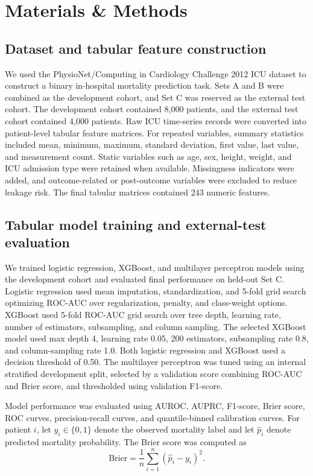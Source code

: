 \documentclass[10pt,twocolumn,letterpaper]{article}
\begin{document}
\section{Materials \& Methods}

\subsection{Dataset and tabular feature construction}

We used the PhysioNet/Computing in Cardiology Challenge 2012 ICU dataset to construct a binary in-hospital mortality prediction task. Sets A and B were combined as the development cohort, and Set C was reserved as the external test cohort. The development cohort contained 8,000 patients, and the external test cohort contained 4,000 patients. Raw ICU time-series records were converted into patient-level tabular feature matrices. For repeated variables, summary statistics included mean, minimum, maximum, standard deviation, first value, last value, and measurement count. Static variables such as age, sex, height, weight, and ICU admission type were retained when available. Missingness indicators were added, and outcome-related or post-outcome variables were excluded to reduce leakage risk. The final tabular matrices contained 243 numeric features.

\subsection{Tabular model training and external-test evaluation}

We trained logistic regression, XGBoost, and multilayer perceptron models using the development cohort and evaluated final performance on held-out Set C. Logistic regression used mean imputation, standardization, and 5-fold grid search optimizing ROC-AUC over regularization, penalty, and class-weight options. XGBoost used 5-fold ROC-AUC grid search over tree depth, learning rate, number of estimators, subsampling, and column sampling. The selected XGBoost model used max depth 4, learning rate 0.05, 200 estimators, subsampling rate 0.8, and column-sampling rate 1.0. Both logistic regression and XGBoost used a decision threshold of 0.50. The multilayer perceptron was tuned using an internal stratified development split, selected by a validation score combining ROC-AUC and Brier score, and thresholded using validation F1-score.

Model performance was evaluated using AUROC, AUPRC, F1-score, Brier score, ROC curves, precision-recall curves, and quantile-binned calibration curves. For patient $i$, let $y_i \in \{0,1\}$ denote the observed mortality label and let $\hat{p}_i$ denote predicted mortality probability. The Brier score was computed as
\begin{equation}
\mathrm{Brier}
=
\frac{1}{n}
\sum_{i=1}^{n}
(\hat{p}_i-y_i)^2.
\end{equation}
\end{document}
